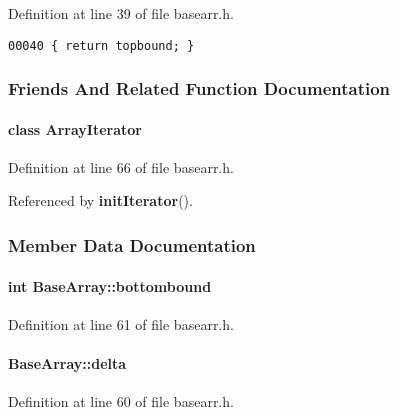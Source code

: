 Definition at line 39 of file basearr.h.\small\begin{verbatim}00040 { return topbound; }
\end{verbatim}\normalsize 


\subsubsection{Friends And Related Function Documentation}
\label{BaseArray_l0}
\paragraph{\setlength{\rightskip}{0pt plus 5cm}class Array\-Iterator\hspace{0.3cm}{\tt  [friend]}}\hfill



Definition at line 66 of file basearr.h.

Referenced by {\bf init\-Iterator}().

\subsubsection{Member Data Documentation}
\label{BaseArray_n1}
\paragraph{\setlength{\rightskip}{0pt plus 5cm}int Base\-Array::bottombound\hspace{0.3cm}{\tt  [protected]}}\hfill



Definition at line 61 of file basearr.h.\label{BaseArray_n0}
\paragraph{ Base\-Array::delta\hspace{0.3cm}{\tt  [protected]}}\hfill



Definition at line 60 of file basearr.h.\label{BaseArray_n4}
